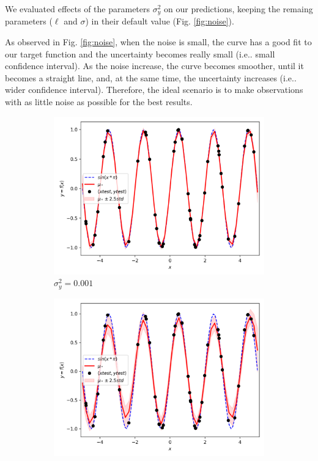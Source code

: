 \documentclass{article}
\makeatletter
\DeclareRobustCommand\onedot{\futurelet\@let@token\@onedot}
\def\@onedot{\ifx\@let@token.\else.\null\fi\xspace}
\def\ie{i.e\onedot} \def\Ie{I.e\onedot}
\makeatother
\begin{document}
We evaluated effects of the parameters $\sigma_y^2$ on our predictions, keeping the remaing parameters ($\ell$ and $\sigma$) in their default value (Fig. \ref{fig:noise}).

As observed in Fig. \ref{fig:noise}, when the noise is small, the curve has a good fit to our target function and the uncertainty becomes really small (\ie small confidence interval). As the noise increase, the curve becomes smoother, until it becomes a straight line, and, at the same time, the uncertainty increases (\ie wider confidence interval). Therefore, the ideal scenario is to make observations with as little noise as possible for the best results.

\begin{figure}[ht]
  \begin{subfigure}{.33\textwidth}
    \centering
    \includegraphics[width=\linewidth]{kernelSE/noise/0_001.png}
    \caption{$\sigma_y^2 = 0.001$}
    \label{fig:noise0001}
  \end{subfigure}
  \begin{subfigure}{.33\textwidth}
    \centering
    \includegraphics[width=\linewidth]{kernelSE/noise/0_01.png}

\end{subfigure}
\end{figure}
\end{document}
